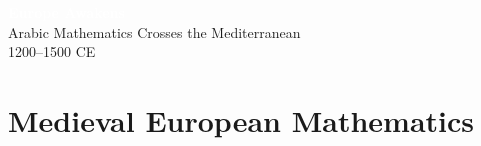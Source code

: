 
{
\begin{frame}[plain]
  \centering
  \vfill
  \textcolor{white}{\Huge\bfseries Europe Awakens}\\[0.7em]
  \textcolor{white!85}{\Large Arabic Mathematics Crosses the Mediterranean}\\[1.5em]
  \textcolor{white!65}{\large 1200--1500 CE}
  \vfill
  \vfill
\end{frame}
}

\section{Medieval European Mathematics}

